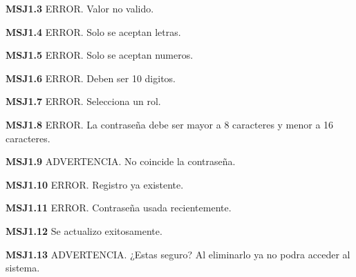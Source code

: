 	\begin{Citemize}
	\item {\bf MSJ1.3} ERROR. Valor no valido.
	\end{Citemize}
	
	\begin{Citemize}
	\item {\bf MSJ1.4} ERROR. Solo se aceptan letras.
	\end{Citemize}
	
	\begin{Citemize}
	\item {\bf MSJ1.5} ERROR. Solo se aceptan numeros.
	\end{Citemize}
	
	\begin{Citemize}
	\item {\bf MSJ1.6} ERROR. Deben ser 10 digitos.
	\end{Citemize}
	
	\begin{Citemize}
	\item {\bf MSJ1.7} ERROR. Selecciona un rol.
	\end{Citemize}
	
	\begin{Citemize}
	\item {\bf MSJ1.8} ERROR. La contraseña debe ser mayor a 8 caracteres y menor a 16 caracteres.
	\end{Citemize}
	
	\begin{Citemize}
	\item {\bf MSJ1.9} ADVERTENCIA. No coincide la contraseña.
	\end{Citemize}
	
	\begin{Citemize}
	\item {\bf MSJ1.10} ERROR. Registro ya existente.
	\end{Citemize}
	
	\begin{Citemize}
	\item {\bf MSJ1.11} ERROR. Contraseña usada recientemente.
	\end{Citemize}
	
	\begin{Citemize}
	\item {\bf MSJ1.12} Se actualizo exitosamente.
	\end{Citemize}
	
	\begin{Citemize}
	\item {\bf MSJ1.13} ADVERTENCIA. ¿Estas seguro? Al eliminarlo ya no podra acceder al sistema.
	\end{Citemize}
	
